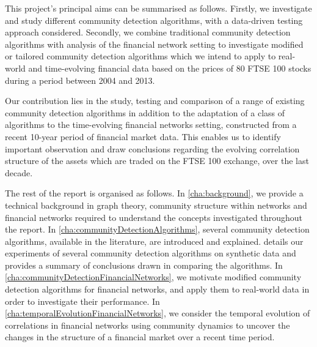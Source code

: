 This project's principal aims can be summarised as follows.
Firstly, we investigate and study different community detection algorithms, with a data-driven testing approach considered.
Secondly, we combine traditional community detection algorithms with analysis of the financial network setting to investigate modified or tailored community detection algorithms which we intend to apply to real-world and time-evolving financial data based on the prices of 80 FTSE 100 stocks during a period between 2004 and 2013.

Our contribution lies in the study, testing and comparison of a range of existing community detection algorithms in addition to the adaptation of a class of algorithms to the time-evolving financial networks setting, constructed from a recent 10-year period of financial market data.
This enables us to identify important observation and draw conclusions regarding the evolving correlation structure of the assets which are traded on the FTSE 100 exchange, over the last decade.

The rest of the report is organised as follows.
In \cref{cha:background}, we provide a technical background in graph theory, community structure within networks and financial networks required to understand the concepts investigated throughout the report.
In \cref{cha:communityDetectionAlgorithms}, several community detection algorithms, available in the literature, are introduced and explained.
 details our experiments of several community detection algorithms on synthetic data and provides a summary of conclusions drawn in comparing the algorithms.
In \cref{cha:communityDetectionFinancialNetworks}, we motivate modified community detection algorithms for financial networks, and apply them to real-world data in order to investigate their performance.
In \cref{cha:temporalEvolutionFinancialNetworks}, we consider the temporal evolution of correlations in financial networks using community dynamics to uncover the changes in the structure of a financial market over a recent time period.